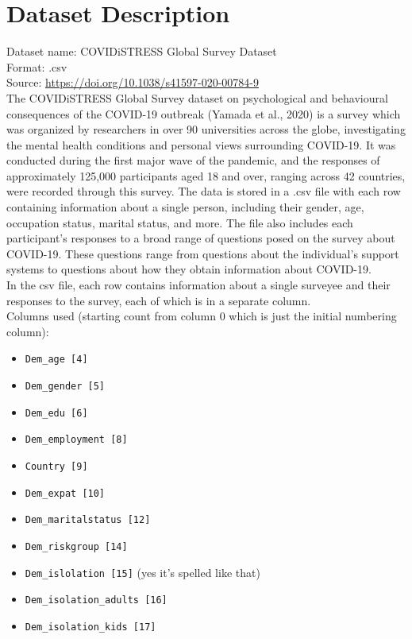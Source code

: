 \documentclass[fontsize=11pt]{article}
\begin{document}
    \section*{Dataset Description}

    Dataset name: COVIDiSTRESS Global Survey Dataset \\
    Format: .csv \\
    Source: \url{https://doi.org/10.1038/s41597-020-00784-9} \\

	The COVIDiSTRESS Global Survey dataset on psychological and behavioural consequences of the COVID-19 outbreak (Yamada et al., 2020) is a survey which was organized by researchers in over 90 universities across the globe, investigating the mental health conditions and personal views surrounding COVID-19. It was conducted during the first major wave of the pandemic, and the responses of approximately 125,000 participants aged 18 and over, ranging across 42 countries, were recorded through this survey. The data is stored in a .csv file with each row containing information about a single person, including their gender, age, occupation status, marital status, and more. The file also includes each participant's responses to a broad range of questions posed on the survey about COVID-19. These questions range from questions about the individual’s support systems to questions about how they obtain information about COVID-19. \\

    In the csv file, each row contains information about a single surveyee and their responses to the survey, each of which is in a separate column. \\

    Columns used (starting count from column 0 which is just the initial numbering column):
    \begin{itemize}
        \item \texttt{Dem\_age [4]}
        \item \texttt{Dem\_gender [5]}
        \item \texttt{Dem\_edu [6]}
        \item \texttt{Dem\_employment [8]}
        \item \texttt{Country [9]}
        \item \texttt{Dem\_expat [10]}
        \item \texttt{Dem\_maritalstatus [12]}
        \item \texttt{Dem\_riskgroup [14]}
        \item \texttt{Dem\_islolation [15]}  (yes it's spelled like that)
        \item \texttt{Dem\_isolation\_adults [16]}
        \item \texttt{Dem\_isolation\_kids [17]}
    \end{itemize}
\end{document}
